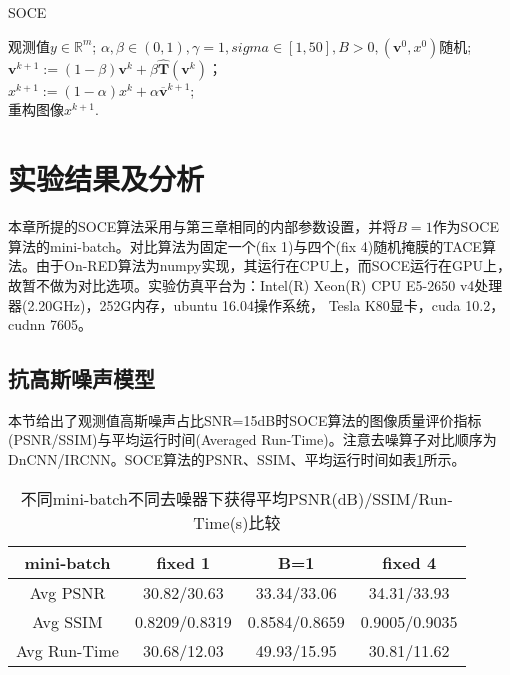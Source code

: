 \begin{algorithm}[!htbp]
	\caption{SOCE}
	\label{algorithm:4-2}
	\begin{algorithmic}[1]
		\REQUIRE	观测值$y\in \mathbb{R}^m$; %
		\ENSURE		%
		$\alpha,\beta\in(0,1),\gamma{=1},sigma\in[1,50],B>0,(\mathbf{v}^0,x^0)$随机; \\
		\STATE	$\mathbf{v}^{k+1}:=(1-\beta)\mathbf{v}^{k}+\beta\hat{\mathbf{T}}(\mathbf{v}^{k})$；	\\  %
		\STATE	$x^{k+1}:=(1-\alpha)x^k + \alpha\overline{\mathbf{v}}^{k+1}$; \\	%
		\ENDWHILE
		\RETURN 重构图像$x^{k+1}$. %
	\end{algorithmic}
\end{algorithm}

\section{实验结果及分析}
本章所提的SOCE算法采用与第三章相同的内部参数设置，并将$B=1$作为SOCE算法的mini-batch。对比算法为固定一个(fix 1)与四个(fix 4)随机掩膜的TACE算法。由于On-RED算法为numpy实现，其运行在CPU上，而SOCE运行在GPU上，故暂不做为对比选项。实验仿真平台为：Intel(R) Xeon(R) CPU E5-2650 v4处理器(2.20GHz)，252G内存，ubuntu 16.04操作系统， Tesla K80显卡，cuda 10.2，cudnn 7605。

\subsection{抗高斯噪声模型}
本节给出了观测值高斯噪声占比SNR=15dB时SOCE算法的图像质量评价指标(PSNR/SSIM)与平均运行时间(Averaged Run-Time)。注意去噪算子对比顺序为DnCNN/IRCNN。SOCE算法的PSNR、SSIM、平均运行时间如表\ref{table:4-1}所示。
\begin{table}[!htbp]
	\def\arraystretch{1.4}\centering{}
	\caption{不同mini-batch不同去噪器下获得平均PSNR(dB)/SSIM/Run-Time(s)比较}
	\label{table:4-1}
	\begin{tabular*}{\linewidth}{@{}@{\extracolsep{\fill}}cccc@{}}
		\toprule
		mini-batch	& fixed 1 & B=1 & fixed 4\\ %
		\midrule
		Avg PSNR        & 30.82/30.63   & 33.34/33.06  & {\color{red}34.31}/{\color{red}33.93} \\
		Avg SSIM        & 0.8209/0.8319   & 0.8584/0.8659  & {\color{red}0.9005}/{\color{red}0.9035} \\
		Avg Run-Time    & {\color{blue}30.68}/12.03   & 49.93/15.95  & 30.81/{\color{blue}11.62} \\
		\bottomrule
	\end{tabular*}
\end{table}

